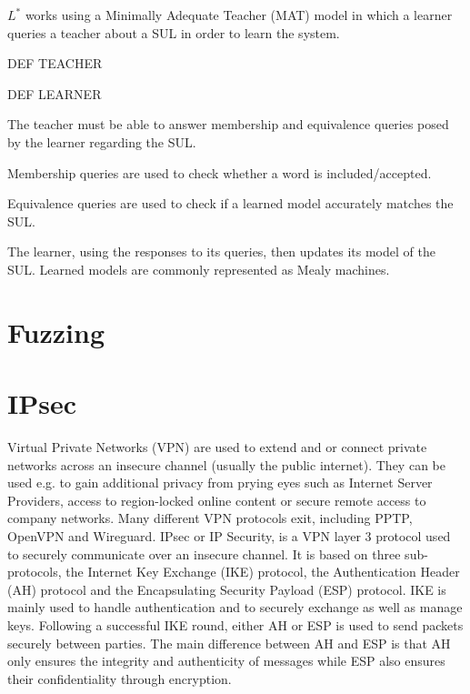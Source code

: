 $L^*$ works using a Minimally Adequate Teacher (MAT) model in which a learner queries a teacher about a SUL in order to learn the system. 

DEF TEACHER

DEF LEARNER

The teacher must be able to answer membership and equivalence queries posed by the learner regarding the SUL. 

Membership queries are used to check whether a word is included/accepted.

Equivalence queries are used to check if a learned model accurately matches the SUL. 

The learner, using the responses to its queries, then updates its model of the SUL. Learned models are commonly represented as Mealy machines. 





\section{Fuzzing}

\section{IPsec}

Virtual Private Networks (VPN) are used to extend and or connect private networks across an insecure channel (usually the public internet). They can be used e.g. to gain additional privacy from prying eyes such as Internet Server Providers, access to region-locked online content or secure remote access to company networks. Many different VPN protocols exit, including PPTP, OpenVPN and Wireguard. IPsec or IP Security, is a VPN layer 3 protocol used to securely communicate over an insecure channel. It is based on three sub-protocols, the Internet Key Exchange (IKE) protocol, the Authentication Header (AH) protocol and the Encapsulating Security Payload (ESP) protocol. IKE is mainly used to handle authentication and to securely exchange as well as manage keys. Following a successful IKE round, either AH or ESP is used to send packets securely between parties. The main difference between AH and ESP is that AH only ensures the integrity and authenticity of messages while ESP also ensures their confidentiality through encryption.

